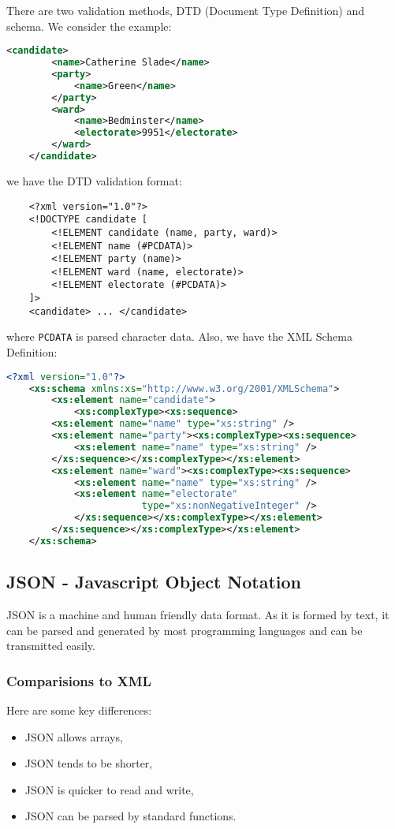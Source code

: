 There are two validation methods, DTD (Document Type Definition)
and schema. We consider the example: \begin{lstlisting}[language=XML]
    <candidate>
        <name>Catherine Slade</name>
        <party>
            <name>Green</name>
        </party>
        <ward>
            <name>Bedminster</name>
            <electorate>9951</electorate>
        </ward>
    </candidate>
\end{lstlisting} we have the DTD validation format: 
\begin{lstlisting}
    <?xml version="1.0"?>
    <!DOCTYPE candidate [
        <!ELEMENT candidate (name, party, ward)>
        <!ELEMENT name (#PCDATA)>
        <!ELEMENT party (name)>
        <!ELEMENT ward (name, electorate)>
        <!ELEMENT electorate (#PCDATA)>
    ]>
    <candidate> ... </candidate>
\end{lstlisting} where \texttt{PCDATA} is parsed character data.
Also, we have the XML Schema Definition:
\begin{lstlisting}[language=XML]
    <?xml version="1.0"?>
    <xs:schema xmlns:xs="http://www.w3.org/2001/XMLSchema">
        <xs:element name="candidate">
            <xs:complexType><xs:sequence>
        <xs:element name="name" type="xs:string" />
        <xs:element name="party"><xs:complexType><xs:sequence>
            <xs:element name="name" type="xs:string" />
        </xs:sequence></xs:complexType></xs:element>
        <xs:element name="ward"><xs:complexType><xs:sequence>
            <xs:element name="name" type="xs:string" />
            <xs:element name="electorate"
                        type="xs:nonNegativeInteger" />
            </xs:sequence></xs:complexType></xs:element>
        </xs:sequence></xs:complexType></xs:element>
    </xs:schema>
\end{lstlisting}

\subsection{JSON - Javascript Object Notation}

JSON is a machine and human friendly data format.
As it is formed by text, it can be parsed and generated by most
programming languages and can be transmitted easily.

\subsubsection{Comparisions to XML}

Here are some key differences: \begin{itemize}
    \item JSON allows arrays,
    \item JSON tends to be shorter,
    \item JSON is quicker to read and write,
    \item JSON can be parsed by standard functions.
\end{itemize}